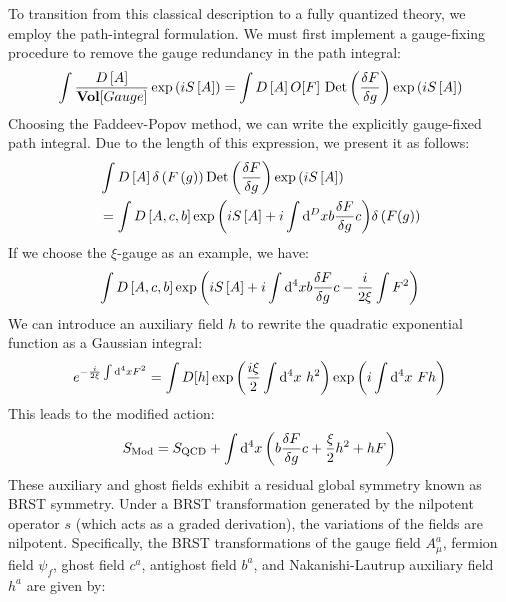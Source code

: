 To transition from this classical description to a fully quantized theory, we employ the path-integral formulation. We must first implement a gauge-fixing procedure to remove the gauge redundancy in the path integral:
\begin{equation}
\int{\frac{D\left[ A \right]}{{\rm \mathbf{Vol}}[Gauge]} \exp \left( iS\left[ A \right] \right)} = \int{D\left[ A\right] O[F]\ {\rm Det}\left(\frac{\delta F}{\delta g}\right) \exp \left( iS\left[ A\right] \right)}
\end{equation}
Choosing the Faddeev-Popov method, we can write the explicitly gauge-fixed path integral. Due to the length of this expression, we present it as follows:
\begin{equation*}
\begin{split}
&\int{D\left[ A\right]\delta \left( F\left( g \right) \right) {\rm Det}\left( \frac{\delta F}{ \delta g} \right) \exp \left( iS\left[ A\right] \right)} \\
&= \int{D\left[ A,c,b\right] \exp \left( iS\left[ A \right]+i\int{{\rm d}^Dx b\frac{\delta F}{\delta g}c} \right)}\delta\left( F(g)\right)
\end{split}
\end{equation*}
If we choose the $\xi$-gauge as an example, we have:
\begin{equation}
\int{D\left[ A,c,b \right] \exp \left( iS\left[ A \right] +i\int{{\rm d}^4x b\frac{\delta F}{\delta g}c}-\frac{i}{2\xi}\int F^2 \right)}
\end{equation}
We can introduce an auxiliary field $h$ to rewrite the quadratic exponential function as a Gaussian integral:
\begin{equation}
e^{-\frac{i}{2\xi}\int {\rm d}^4 x F^2}=\int D[h] \exp\left(\frac{i\xi}{2} \int{{\rm d}^4x\ h^2}\right)\exp\left(i\int {\rm d}^4 x\ Fh\right)
\end{equation}
This leads to the modified action:
\begin{equation}
S_{\rm Mod}=S_{\rm QCD}+\int {\rm d}^4x \left( b\frac{\delta F}{\delta g}c+\frac{\xi}{2} h^2 +h F \right)
\end{equation}
These auxiliary and ghost fields exhibit a residual global symmetry known as BRST symmetry. Under a BRST transformation generated by the nilpotent operator $s$ (which acts as a graded derivation), the variations of the fields are nilpotent. Specifically, the BRST transformations of the gauge field $A_\mu^a$, fermion field $\psi_f$, ghost field $c^a$, antighost field $b^a$, and Nakanishi-Lautrup auxiliary field $h^a$ are given by:
